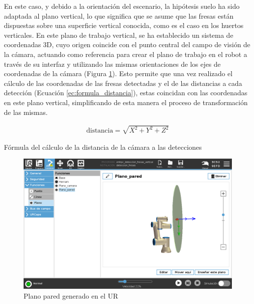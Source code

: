 En este caso, y debido a la orientación del escenario, la hipótesis suelo ha sido adaptada al plano vertical, lo que significa que se asume que las fresas están dispuestas sobre una superficie vertical conocida, como es el caso en los huertos verticales. En este plano de trabajo vertical, se ha establecido un sistema de coordenadas 3D, cuyo origen coincide con el punto central del campo de visión de la cámara, actuando como referencia para crear el plano de trabajo en el robot a través de su interfaz y utilizando las mismas orientaciones de los ejes de coordenadas de la cámara (Figura \ref{fig:Plano_pared_UR}). Esto permite que una vez realizado el cálculo de las coordenadas de las fresas detectadas y el de las distancias a cada detección (Ecuación \ref{ec:formula_distancia}), estas coincidan con las coordenadas en este plano vertical, simplificando de esta manera el proceso de transformación de las mismas. 

\begin{myequation}[H]
  \begin{align}
    \text{distancia} = \sqrt{X^2 + Y^2 + Z^2}
  \nonumber
  \end{align}
\caption{Fórmula del cálculo de la distancia de la cámara a las detecciones}
\label{ec:formula_distancia}
\end{myequation}


\begin{figure} [H]
    \begin{center}
      \includegraphics[width=155mm]{figs/Plano Pared Programa UR.png}
    \end{center}
    \caption{Plano pared generado en el UR}
    \label{fig:Plano_pared_UR}
\end{figure}


